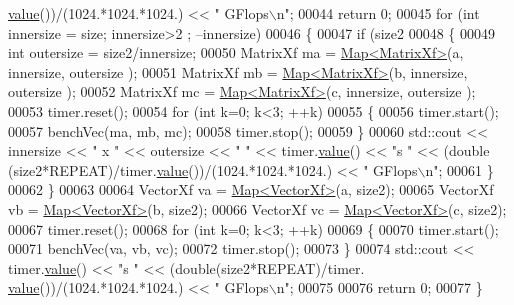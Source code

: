 \begin{DoxyCode}
      \hyperlink{class_eigen_1_1_bench_timer_a26760f963ed8b64c126159bfea57735e}{value}())/(1024.*1024.*1024.) << \textcolor{stringliteral}{" GFlops\(\backslash\)n"};
00044     \textcolor{keywordflow}{return} 0;
00045     \textcolor{keywordflow}{for} (\textcolor{keywordtype}{int} innersize = size; innersize>2 ; --innersize)
00046     \{
00047         \textcolor{keywordflow}{if} (size2%
00048         \{
00049             \textcolor{keywordtype}{int} outersize = size2/innersize;
00050             MatrixXf ma = \hyperlink{group___core___module_class_eigen_1_1_map}{Map<MatrixXf>}(a, innersize, outersize );
00051             MatrixXf mb = \hyperlink{group___core___module_class_eigen_1_1_map}{Map<MatrixXf>}(b, innersize, outersize );
00052             MatrixXf mc = \hyperlink{group___core___module_class_eigen_1_1_map}{Map<MatrixXf>}(c, innersize, outersize );
00053             timer.reset();
00054             \textcolor{keywordflow}{for} (\textcolor{keywordtype}{int} k=0; k<3; ++k)
00055             \{
00056                 timer.start();
00057                 benchVec(ma, mb, mc);
00058                 timer.stop();
00059             \}
00060             std::cout << innersize << \textcolor{stringliteral}{" x "} << outersize << \textcolor{stringliteral}{"  "} << timer.\hyperlink{class_eigen_1_1_bench_timer_a26760f963ed8b64c126159bfea57735e}{value}() << \textcolor{stringliteral}{"s   "} << (double
      (size2*REPEAT)/timer.\hyperlink{class_eigen_1_1_bench_timer_a26760f963ed8b64c126159bfea57735e}{value}())/(1024.*1024.*1024.) << \textcolor{stringliteral}{" GFlops\(\backslash\)n"};
00061         \}
00062     \}
00063     
00064     VectorXf va = \hyperlink{group___core___module_class_eigen_1_1_map}{Map<VectorXf>}(a, size2);
00065     VectorXf vb = \hyperlink{group___core___module_class_eigen_1_1_map}{Map<VectorXf>}(b, size2);
00066     VectorXf vc = \hyperlink{group___core___module_class_eigen_1_1_map}{Map<VectorXf>}(c, size2);
00067     timer.reset();
00068     \textcolor{keywordflow}{for} (\textcolor{keywordtype}{int} k=0; k<3; ++k)
00069     \{
00070         timer.start();
00071         benchVec(va, vb, vc);
00072         timer.stop();
00073     \}
00074     std::cout << timer.\hyperlink{class_eigen_1_1_bench_timer_a26760f963ed8b64c126159bfea57735e}{value}() << \textcolor{stringliteral}{"s   "} << (double(size2*REPEAT)/timer.
      \hyperlink{class_eigen_1_1_bench_timer_a26760f963ed8b64c126159bfea57735e}{value}())/(1024.*1024.*1024.) << \textcolor{stringliteral}{" GFlops\(\backslash\)n"};
00075 
00076     \textcolor{keywordflow}{return} 0;
00077 \}

\end{DoxyCode}
